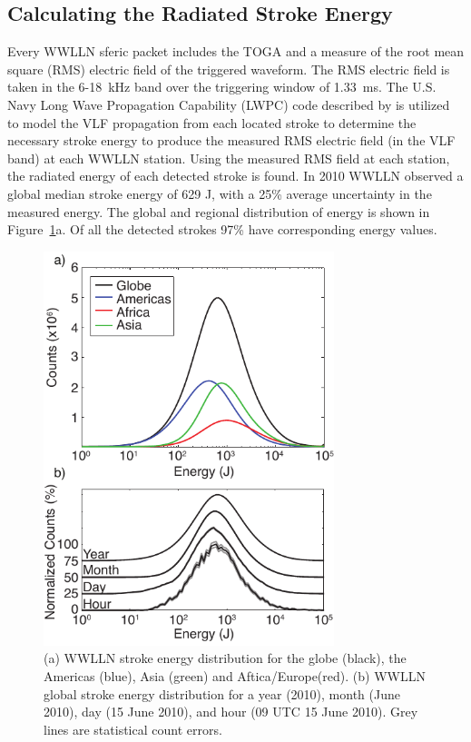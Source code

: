 \subsection{Calculating the Radiated Stroke Energy}

Every WWLLN sferic packet includes the TOGA and a measure of the root mean square (RMS) electric field of the triggered waveform.
The RMS electric field is taken in the 6-18~kHz band over the triggering window of 1.33~ms.
The U.S. Navy Long Wave Propagation Capability (LWPC) code described by \citet{Ferguson1998} is utilized to model the VLF propagation from each located stroke to determine the necessary stroke energy to produce the measured RMS electric field (in the VLF band) at each WWLLN station.
Using the measured RMS field at each station, the radiated energy of each detected stroke is found.
In 2010 WWLLN observed a global median stroke energy of 629 J, with a 25\% average uncertainty in the measured energy.
The global and regional distribution of energy is shown in Figure~\ref{efficiency:fig:2010_Energy}a.
Of all the detected strokes 97\% have corresponding energy values.
\citep{Hutchins2012}

\begin{figure}[ht!]
   \centering
\noindent\includegraphics[width=20pc]{efficiency/Figures/2012RS005049-p1.pdf} 
   \caption{(a) WWLLN stroke energy distribution for the globe (black), the Americas (blue), Asia (green) and Aftica/Europe(red).
(b) WWLLN global stroke energy distribution for a year (2010), month (June 2010), day (15 June 2010), and hour (09 UTC 15 June 2010).
Grey lines are statistical count errors.}
   \label{efficiency:fig:2010_Energy}
\end{figure}

